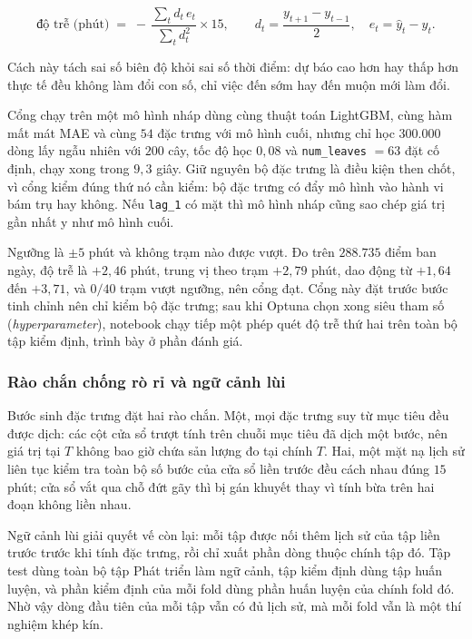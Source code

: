 \begin{equation}
\text{độ trễ (phút)} \;=\; -\,\frac{\sum_t d_t \, e_t}{\sum_t d_t^{2}} \times 15,
\qquad
d_t = \frac{y_{t+1} - y_{t-1}}{2}, \quad e_t = \hat{y}_t - y_t .
\end{equation}

Cách này tách sai số biên độ khỏi sai số thời điểm: dự báo cao hơn hay thấp hơn thực tế
đều không làm đổi con số, chỉ việc đến sớm hay đến muộn mới làm đổi.

Cổng chạy trên một mô hình nháp dùng cùng thuật toán LightGBM, cùng hàm mất mát MAE và
cùng $54$ đặc trưng với mô hình cuối, nhưng chỉ học $300.000$ dòng lấy ngẫu nhiên với
$200$ cây, tốc độ học $0{,}08$ và \texttt{num\_leaves} $=63$ đặt cố định, chạy xong trong
$9{,}3$ giây. Giữ nguyên bộ đặc trưng là điều kiện then chốt, vì cổng kiểm đúng thứ nó
cần kiểm: bộ đặc trưng có đẩy mô hình vào hành vi bám trụ hay không. Nếu \texttt{lag\_1}
có mặt thì mô hình nháp cũng sao chép giá trị gần nhất y như mô hình cuối.

Ngưỡng là $\pm 5$ phút và không trạm nào được vượt. Đo trên $288.735$ điểm ban ngày, độ
trễ là $+2{,}46$ phút, trung vị theo trạm $+2{,}79$ phút, dao động từ $+1{,}64$ đến
$+3{,}71$, và $0/40$ trạm vượt ngưỡng, nên cổng đạt. Cổng này đặt trước bước tinh chỉnh
nên chỉ kiểm bộ đặc trưng; sau khi Optuna chọn xong siêu tham số (\textit{hyperparameter}), notebook chạy tiếp một
phép quét độ trễ thứ hai trên toàn bộ tập kiểm định, trình bày ở phần đánh giá.

\subsubsection{Rào chắn chống rò rỉ và ngữ cảnh lùi}

Bước sinh đặc trưng đặt hai rào chắn. Một, mọi đặc trưng suy từ mục tiêu đều được dịch:
các cột cửa sổ trượt tính trên chuỗi mục tiêu đã dịch một bước, nên giá trị tại $T$ không
bao giờ chứa sản lượng đo tại chính $T$. Hai, một mặt nạ lịch sử liên tục kiểm tra toàn
bộ số bước của cửa sổ liền trước đều cách nhau đúng $15$ phút; cửa sổ vắt qua chỗ đứt gãy
thì bị gán khuyết thay vì tính bừa trên hai đoạn không liền nhau.

Ngữ cảnh lùi giải quyết vế còn lại: mỗi tập được nối thêm lịch sử của tập liền trước
trước khi tính đặc trưng, rồi chỉ xuất phần dòng thuộc chính tập đó. Tập test dùng toàn
bộ tập Phát triển làm ngữ cảnh, tập kiểm định dùng tập huấn luyện, và phần kiểm định của
mỗi fold dùng phần huấn luyện của chính fold đó. Nhờ vậy dòng đầu tiên của mỗi tập vẫn có
đủ lịch sử, mà mỗi fold vẫn là một thí nghiệm khép kín.

